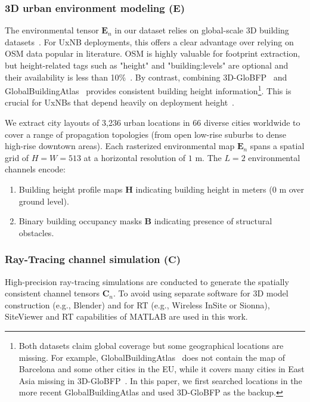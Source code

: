 \documentclass[10pt,conference,letterpaper]{IEEEtran}
\begin{document}
\subsubsection{3D urban environment modeling ($\mathbf{E}$)}
\label{sec:env_model}
The environmental tensor $\mathbf{E}_n$ in our dataset relies on global-scale 3D building datasets~\cite{Che2024globfp,Zhu2025atlas}. For UxNB deployments, this offers a clear advantage over relying on OSM data popular in literature. OSM is highly valuable for footprint extraction, but height-related tags such as {"height"} and {"building:levels"} are optional and their availability is less than 10\%~\cite{Bernard2022}. By contrast, combining 3D-GloBFP~\cite{Che2024globfp} and GlobalBuildingAtlas~\cite{Zhu2025atlas} provides consistent building height information\footnote{Both datasets claim global coverage but some geographical locations are missing. For example, GlobalBuildingAtlas~\cite{Zhu2025atlas} does not contain the map of Barcelona and some other cities in the EU, while it covers many cities in East Asia missing in 3D-GloBFP~\cite{Che2024globfp}. In this paper, we first searched locations in the more recent GlobalBuildingAtlas and used 3D-GloBFP as the backup.}. This is crucial for UxNBs that depend heavily on deployment height~\cite{Vinogradov2018}.

We extract city layouts of 3,236 urban locations in 66 diverse cities worldwide to cover a range of propagation topologies (from open low-rise suburbs to dense high-rise downtown areas). Each rasterized environmental map $\mathbf{E}_n$ spans a spatial grid of $H = W = 513$ at a horizontal resolution of $1\text{~m}$. The $L=2$ environmental channels encode:
\begin{enumerate}
    \item Building height profile maps $\mathbf{H}$ indicating building height in meters ($0\text{~m}$ over ground level).
    \item Binary building occupancy masks $\mathbf{B}$ indicating presence of structural obstacles.
\end{enumerate}

\subsubsection{Ray-Tracing channel simulation ($\mathbf{C}$)}
\label{sec:rt_sim}
High-precision ray-tracing simulations are conducted to generate the spatially consistent channel tensors $\mathbf{C}_n$. To avoid using separate software for 3D model construction (e.g., Blender) and for RT (e.g., Wireless InSite or Sionna), SiteViewer and RT capabilities of MATLAB are used in this work. %
\end{document}
